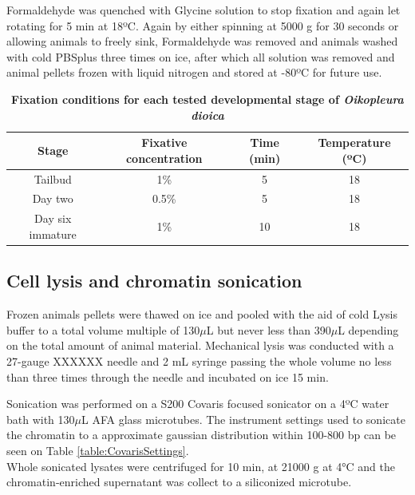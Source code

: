 \documentclass[11pt,twoside,a4paper]{report}
\begin{document}
			Formaldehyde was quenched with Glycine solution to stop fixation and again let rotating for 5 min at 18ºC. 
			Again by either spinning at 5000 g for 30 seconds or allowing animals to freely sink, Formaldehyde was removed and animals washed with cold PBSplus three times on ice, after which all solution was removed and animal pellets frozen with liquid nitrogen and stored at -80ºC for future use.
    
    		 \begin{table}[!ht]
	    	    \caption{\bf{Fixation conditions for each tested developmental stage of \textit{Oikopleura dioica}}}
        		\begin{center}
		            \begin{tabular}{c|c|c|c}
                		\textbf{Stage} & \textbf{Fixative concentration} & \textbf{Time (min)} & \textbf{Temperature (ºC)}\\
		                \hline
		                Tailbud & 1\% & 5 & 18\\
		                Day two & 0.5\% & 5 & 18\\
		                Day six immature & 1\% & 10 & 18\\
        		    \end{tabular}
		        \end{center}
        		\label{table:ODfixation}
		    \end{table}
    
    			\subsection{Cell lysis and chromatin sonication}
			Frozen animals pellets were thawed on ice and pooled with the aid of cold Lysis buffer to a total volume multiple of 130$\mu$L but never less than 390$\mu$L depending on the total amount of animal material.		
			Mechanical lysis was conducted with a 27-gauge XXXXXX needle and 2 mL syringe passing the whole volume no less than three times through the needle and incubated on ice 15 min.
			
			Sonication was performed on a S200 Covaris focused sonicator on a 4ºC water bath with 130$\mu$L AFA glass microtubes. The instrument settings used to sonicate the chromatin to a approximate gaussian distribution within 100-800 bp can be seen on Table \ref{table:CovarisSettings}. \\
			Whole sonicated lysates were centrifuged for 10 min, at 21000 g at 4°C and the chromatin-enriched supernatant was collect to a siliconized microtube.
			
\end{document}
